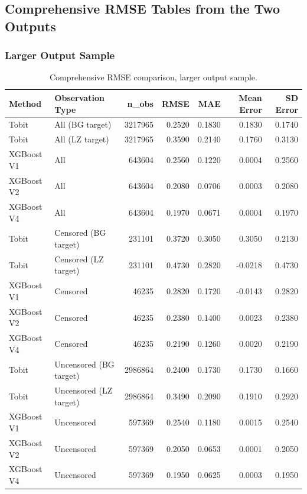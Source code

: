 \documentclass{article}
\begin{document}
\subsection{Comprehensive RMSE Tables from the Two Outputs}

\subsubsection{Larger Output Sample}

\begin{table}[H]
\centering
\small
\begin{tabular}{llrrrrr}
\toprule
Method & Observation Type & n\_obs & RMSE & MAE & Mean Error & SD Error \\
\midrule
Tobit & All (BG target) & 3217965 & 0.2520 & 0.1830 & 0.1830 & 0.1740 \\
Tobit & All (LZ target) & 3217965 & 0.3590 & 0.2140 & 0.1760 & 0.3130 \\
XGBoost V1 & All & 643604 & 0.2560 & 0.1220 & 0.0004 & 0.2560 \\
XGBoost V2 & All & 643604 & 0.2080 & 0.0706 & 0.0003 & 0.2080 \\
XGBoost V4 & All & 643604 & 0.1970 & 0.0671 & 0.0004 & 0.1970 \\
Tobit & Censored (BG target) & 231101 & 0.3720 & 0.3050 & 0.3050 & 0.2130 \\
Tobit & Censored (LZ target) & 231101 & 0.4730 & 0.2820 & -0.0218 & 0.4730 \\
XGBoost V1 & Censored & 46235 & 0.2820 & 0.1720 & -0.0143 & 0.2820 \\
XGBoost V2 & Censored & 46235 & 0.2380 & 0.1400 & 0.0023 & 0.2380 \\
XGBoost V4 & Censored & 46235 & 0.2190 & 0.1260 & 0.0020 & 0.2190 \\
Tobit & Uncensored (BG target) & 2986864 & 0.2400 & 0.1730 & 0.1730 & 0.1660 \\
Tobit & Uncensored (LZ target) & 2986864 & 0.3490 & 0.2090 & 0.1910 & 0.2920 \\
XGBoost V1 & Uncensored & 597369 & 0.2540 & 0.1180 & 0.0015 & 0.2540 \\
XGBoost V2 & Uncensored & 597369 & 0.2050 & 0.0653 & 0.0001 & 0.2050 \\
XGBoost V4 & Uncensored & 597369 & 0.1950 & 0.0625 & 0.0003 & 0.1950 \\
\bottomrule
\end{tabular}
\caption{Comprehensive RMSE comparison, larger output sample.}
\label{tab:comprehensive_rmse_large}
\end{table}
\end{document}
